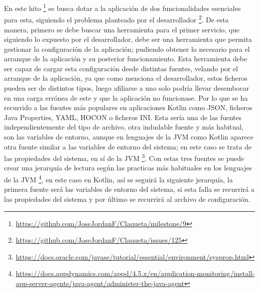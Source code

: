 En este hito \footnote{\url{https://github.com/JoseJordanF/Claqueta/milestone/9}} se busca dotar a la aplicación de
dos funcionalidades esenciales para esta, siguiendo el problema planteado por el desarrollador 
\footnote{\url{https://github.com/JoseJordanF/Claqueta/issues/125}}. De esta manera, primero se debe buscar una 
herramienta para el primer servicio, que siguiendo lo expuesto por el desarrollador, debe ser una herramienta que 
permita gestionar la configuración de la aplicación; pudiendo obtener lo necesario para el arranque de la aplicación 
y su posterior funcionamiento. Esta herramienta debe ser capaz de cargar esta configuración desde distintas fuentes, 
velando por el arranque de la aplicación, ya que como menciona el desarrollador, estos ficheros pueden ser de 
distintos tipos, luego afiliarse a uno solo podría llevar desembocar en una carga errónea de este y que la 
aplicación no funcionase. Por lo que se ha recurrido a las fuentes más populares en aplicaciones Kotlin 
\cite{popularConfig} como JSON\cite{JsonWiki}, ficheros Java Properties\cite{JProWiki}, YAML\cite{YmlWiki}, 
HOCON\cite{HoconWiki} o ficheros INI\cite{IniWiki}. Esta sería una de las fuentes independientemente del tipo de 
archivo, otra indudable fuente y más habitual, son las variables de entorno, aunque en lenguajes de la JVM como 
Kotlin aparece otra fuente similar a las variables de entorno del sistema; en este caso se trata de las propiedades
del sistema, en sí de la JVM 
\footnote{\url{https://docs.oracle.com/javase/tutorial/essential/environment/sysprop.html}}. Con estas tres fuentes
se puede crear una jerarquía de lectura según las practicas más habituales en los lenguajes de la JVM 
\footnote{\url{https://docs.appdynamics.com/appd/4.5.x/en/application-monitoring/install-app-server-agents/java-agent/administer-the-java-agent}}, 
en este caso en Kotlin, así se seguirá la siguiente jerarquía, la primera fuente 
será las variables de entorno del sistema, si esta falla se recurrirá a las propiedades del sistema 
\cite{SecrectsJavaP} y por último se recurrirá al archivo de configuración.

